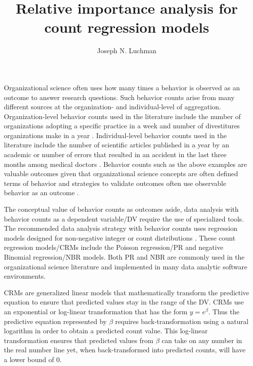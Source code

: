 \documentclass[doc]{apa7}
\title{Relative importance analysis for count regression models}
\author{Joseph N. Luchman}
\affiliation{Fors Marsh}
\begin{document}
\maketitle

	Organizational science often uses how many times a behavior is observed as an outcome to answer research questions. 
	Such behavior counts arise from many different sources at the organization- and individual-level of aggregation.
	Organization-level behavior counts used in the literature include the number of organizations adopting a specific practice in a week \parencite{naumovska2021strength} and number of divestitures organizations make in a year \parencite{bettinazzi2021stakeholder}. 
	Individual-level behavior counts used in the literature include the number of scientific articles published in a year by an academic \parencite{rotolo2013does} or number of errors that resulted in an accident in the last three months among medical doctors \parencite{naveh2015active}.
	Behavior counts such as the above examples are valuable outcomes given that organizational science concepts are often defined terms of behavior \parencite[e.g., job performance;][]{motowidlo2003job} and strategies to validate outcomes often use observable behavior as an outcome \parencite[e.g., criterion-oriented validity;][]{cronbach1955construct}.
	
	The conceptual value of behavior counts as outcomes aside, data analysis with behavior counts as a dependent variable/DV require the use of specialized tools.
	The recommended data analysis strategy with behavior counts uses regression models designed for non-negative integer or count distributions \parencite[e.g.,][]{blevins2015count}.
	These count regression models/CRMs include the Poisson regression/PR and negative Binomial regression/NBR models.
	Both PR and NBR are commonly used in the organizational science literature and implemented in many data analytic software environments.
	
	CRMs are generalized linear models that mathematically transform the predictive equation to ensure that predicted values stay in the range of the DV.
	CRMs use an exponential or log-linear transformation that has the form $y = e^{\beta}$. 
	Thus the predictive equation represented by $\beta$ requires back-transformation using a natural logarithm in order to obtain a predicted count value.
	This log-linear transformation ensures that predicted values from $\beta$ can take on any number in the real number line yet, when back-transformed into predicted counts, will have a lower bound of 0.
	
\end{document}
